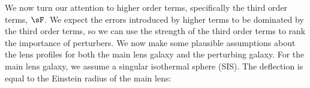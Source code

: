 We now turn our attention to higher order terms, specifically the third order terms, $\sF$. We expect the errors introduced by higher terms to be dominated by the third order terms, so we can use the strength of the third order terms to rank the importance of perturbers. We now make some plausible assumptions about the lens profiles for both the main lens galaxy and the perturbing galaxy. For the main lens galaxy, we assume a singular isothermal sphere (SIS). The deflection is equal to the Einstein radius of the main lens: